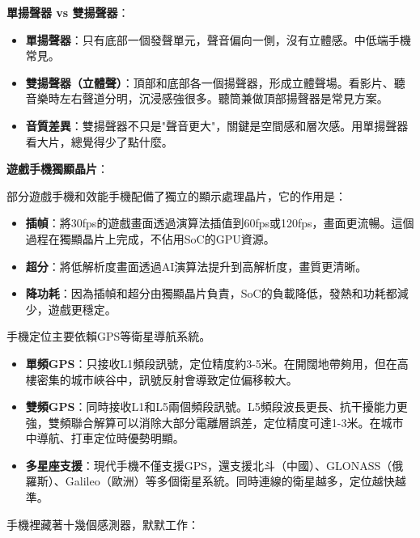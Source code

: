 \textbf{單揚聲器 vs 雙揚聲器}：

\begin{itemize}
  \item \textbf{單揚聲器}：只有底部一個發聲單元，聲音偏向一側，沒有立體感。中低端手機常見。
  \item \textbf{雙揚聲器（立體聲）}：頂部和底部各一個揚聲器，形成立體聲場。看影片、聽音樂時左右聲道分明，沉浸感強很多。聽筒兼做頂部揚聲器是常見方案。
  \item \textbf{音質差異}：雙揚聲器不只是"聲音更大"，關鍵是空間感和層次感。用單揚聲器看大片，總覺得少了點什麼。
\end{itemize}

\textbf{遊戲手機獨顯晶片}：

部分遊戲手機和效能手機配備了獨立的顯示處理晶片，它的作用是：

\begin{itemize}
  \item \textbf{插幀}：將30fps的遊戲畫面透過演算法插值到60fps或120fps，畫面更流暢。這個過程在獨顯晶片上完成，不佔用SoC的GPU資源。
  \item \textbf{超分}：將低解析度畫面透過AI演算法提升到高解析度，畫質更清晰。
  \item \textbf{降功耗}：因為插幀和超分由獨顯晶片負責，SoC的負載降低，發熱和功耗都減少，遊戲更穩定。
\end{itemize}


手機定位主要依賴GPS等衛星導航系統。

\begin{itemize}
  \item \textbf{單頻GPS}：只接收L1頻段訊號，定位精度約3-5米。在開闊地帶夠用，但在高樓密集的城市峽谷中，訊號反射會導致定位偏移較大。
  \item \textbf{雙頻GPS}：同時接收L1和L5兩個頻段訊號。L5頻段波長更長、抗干擾能力更強，雙頻聯合解算可以消除大部分電離層誤差，定位精度可達1-3米。在城市中導航、打車定位時優勢明顯。
  \item \textbf{多星座支援}：現代手機不僅支援GPS，還支援北斗（中國）、GLONASS（俄羅斯）、Galileo（歐洲）等多個衛星系統。同時連線的衛星越多，定位越快越準。
\end{itemize}


手機裡藏著十幾個感測器，默默工作：

